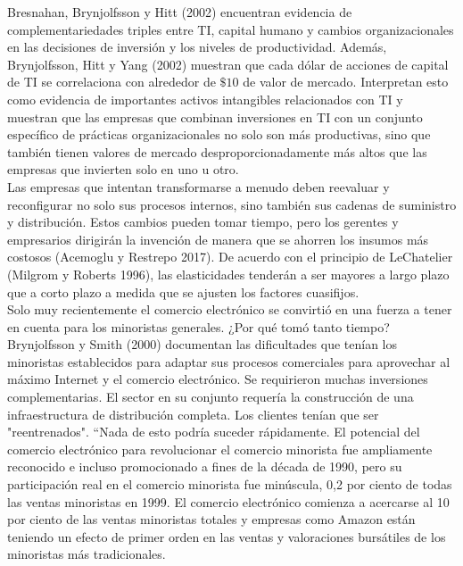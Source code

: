  Bresnahan, Brynjolfsson y Hitt (2002) encuentran evidencia de complementariedades triples entre TI, capital humano y cambios organizacionales en las decisiones de inversión y los niveles de productividad. Además, Brynjolfsson, Hitt y Yang (2002) muestran que cada dólar de acciones de capital de TI se correlaciona con alrededor de $\$10$ de valor de mercado. Interpretan esto como evidencia de importantes activos intangibles relacionados con TI y muestran que las empresas que combinan inversiones en TI con un  conjunto específico de prácticas organizacionales no solo son más productivas, sino que también tienen valores de mercado desproporcionadamente más altos que las empresas que invierten solo en uno u otro.\\
Las empresas que intentan transformarse a menudo deben reevaluar y reconfigurar no solo sus procesos internos, sino también sus cadenas de suministro y distribución. Estos cambios pueden tomar tiempo, pero los gerentes y empresarios dirigirán la invención de manera que se ahorren los insumos más costosos (Acemoglu y Restrepo 2017). De acuerdo con el principio de LeChatelier (Milgrom y Roberts 1996), las elasticidades tenderán a ser mayores a largo plazo que a corto plazo a medida que se ajusten los factores cuasifijos.\\
Solo muy recientemente el comercio electrónico se convirtió en una fuerza a tener en cuenta para los minoristas generales. ¿Por qué tomó tanto tiempo? Brynjolfsson y Smith (2000) documentan las dificultades que tenían los minoristas establecidos para adaptar sus procesos comerciales para aprovechar al máximo Internet y el comercio electrónico. Se requirieron muchas inversiones complementarias. El sector en su conjunto requería la construcción de una infraestructura de distribución completa. Los clientes tenían que ser "reentrenados". “Nada de esto podría suceder rápidamente. El potencial del comercio electrónico para revolucionar el comercio minorista fue ampliamente reconocido e incluso promocionado a fines de la década de 1990, pero su participación real en el comercio minorista fue minúscula, 0,2 por ciento de todas las ventas minoristas en 1999. El comercio electrónico comienza a acercarse al 10 por ciento de las ventas minoristas totales y empresas como Amazon están teniendo un efecto de primer orden en las ventas y valoraciones bursátiles de los minoristas más tradicionales.\\


